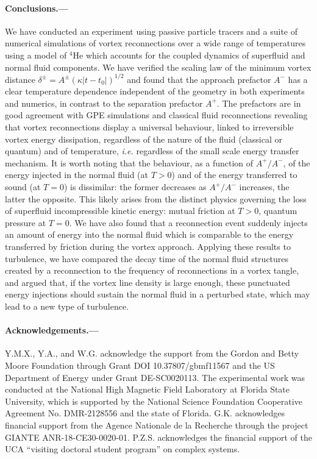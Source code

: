 \documentclass[%
superscriptaddress,
 amsmath,amssymb,
 aps,
]{revtex4-2}
\begin{document}
\paragraph*{Conclusions.---} We have conducted an experiment using passive particle tracers and a suite of numerical simulations of vortex reconnections over a wide range of temperatures using a model of $^4$He which accounts for the coupled dynamics of superfluid and normal fluid components.
We have verified the scaling law of the minimum vortex distance 
$\delta^{\pm}=A^{\pm} (\kappa |t-t_0|)^{1/2}$ and found that the approach prefactor $A^-$ has a clear temperature dependence independent of the geometry in both experiments and numerics, in contrast to the
separation prefactor $A^+$. The prefactors are in good agreement
with GPE simulations \cite{villoisIrreversibleDynamicsVortex2020,allen2014} 
and classical fluid reconnections \cite{yaoSeparationScalingViscous2020}
revealing that vortex reconnections display a universal behaviour, linked to irreversible vortex energy dissipation, regardless of the nature
of the fluid (classical or quantum) and of temperature, \textit{i.e.} regardless of the small scale energy transfer mechanism. 
It is worth noting that the behaviour, as a function of $A^+/A^-$, of 
the energy injected in the normal fluid (at $T>0$) and of the energy transferred to sound (at $T=0$)
\cite{villoisIrreversibleDynamicsVortex2020,leadbeaterSoundEmissionDue2001b} is dissimilar: the former decreases as $A^+/A^-$
increases, the latter the opposite. This likely arises from the distinct physics governing the loss of superfluid 
incompressible kinetic energy: mutual friction at $T>0$, quantum pressure at $T=0$.
We have also found that a reconnection event suddenly injects an amount of energy 
into the normal fluid which is comparable to the energy transferred by friction
during the vortex approach. Applying these results to turbulence, we have
compared the decay time of the normal fluid structures created by a
reconnection to the frequency of reconnections in a vortex tangle, and argued
that, if the vortex line density is large enough, these punctuated
energy injections should sustain the normal fluid in a perturbed state, which may lead to a new type of turbulence.

\paragraph*{Acknowledgements.---} Y.M.X., Y.A., and W.G. acknowledge the support from the Gordon and Betty Moore Foundation through Grant DOI 10.37807/gbmf11567 and the US Department of Energy under Grant DE-SC0020113. The experimental work was conducted at the National High Magnetic Field Laboratory at Florida State University, which is supported by the National Science Foundation Cooperative Agreement No. DMR-2128556 and the state of Florida. G.K. acknowledges financial support from the Agence Nationale de la Recherche through the project GIANTE ANR-18-CE30-0020-01. P.Z.S. acknowledges the financial support of the UCA ``visiting doctoral student program'' on complex systems.
\end{document}
